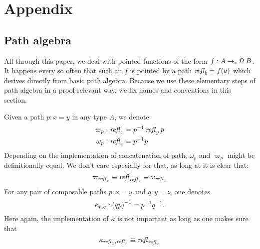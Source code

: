 \documentclass[english,a4]{article}
\newcommand{\ptdto}{\to_\ast}%
\begin{document}
\section{Appendix}
\label{sec:appendix}

\subsection{Path algebra}
\label{sec:path-algebra}
All through this paper, we deal with pointed functions of the form $f:A \ptdto
\loopspace\null B$. It happens every so often that such an $f$ is pointed by a
path $\mathop{{\mathit{refl}}_{b}} = f(a)$ which derives directly from basic path algebra. Because
we use these elementary steps of path algebra in a proof-relevant way, 
we fix names and conventions in this section.

Given a path $p:x=y$ in any type $A$, we denote
\begin{align*}
  \varpi_p &: \mathop{{\mathit{refl}}_{x}} = {p}^{-1} \mathop{{\mathit{refl}}_{y}} p\\
  \omega_p &: \mathop{{\mathit{refl}}_{x}} = {p}^{-1} p
\end{align*}
Depending on the implementation of concatenation of path, $\omega_p$ and $\varpi_p$
might be definitionally equal. We don't care especially for that, as long at it
is clear that:
\begin{displaymath}
  \varpi_{\mathop{{\mathit{refl}}_{x}}} \equiv \mathop{{\mathit{refl}}_{\mathop{{\mathit{refl}}_{x}}}} \equiv \omega_{\mathop{{\mathit{refl}}_{x}}}  
\end{displaymath}
For any pair of composable paths $p: x=y$ and $q: y=z$, one denotes
\begin{displaymath}
  \kappa_{p,q} : {(qp)}^{-1} = {p}^{-1} {q}^{-1}.
\end{displaymath}
Here again, the implementation of $\kappa$ is not important as long as one
makes sure that
\begin{displaymath}
  \kappa_{\mathop{{\mathit{refl}}_{x}},\mathop{{\mathit{refl}}_{x}}} \equiv  \mathop{{\mathit{refl}}_{\mathop{{\mathit{refl}}_{x}}}}
\end{displaymath}
\end{document}
